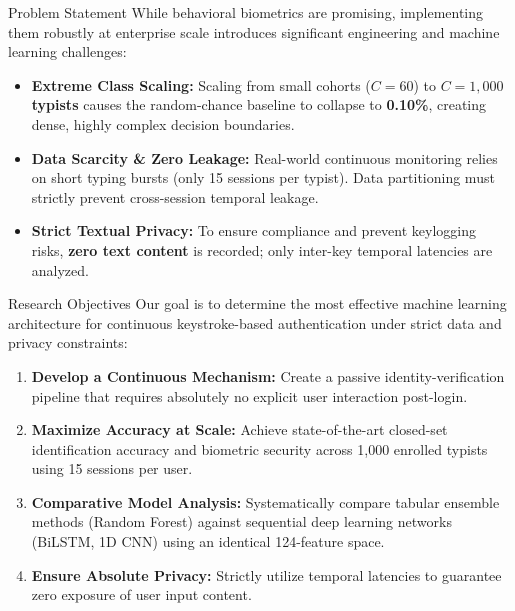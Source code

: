 \documentclass[final]{beamer}
\newlength{\colwidth}
\begin{document}
\begin{frame}[t]
\begin{columns}[t]
\begin{column}{\colwidth}
  \begin{block}{Problem Statement}
    While behavioral biometrics are promising, implementing them robustly at enterprise scale introduces significant engineering and machine learning challenges:
    \begin{itemize}
      \item \textbf{Extreme Class Scaling:} Scaling from small cohorts ($C=60$) to \textbf{$C=1{,}000$ typists} causes the random-chance baseline to collapse to \textbf{0.10\%}, creating dense, highly complex decision boundaries.
      \item \textbf{Data Scarcity \& Zero Leakage:} Real-world continuous monitoring relies on short typing bursts (only 15 sessions per typist). Data partitioning must strictly prevent cross-session temporal leakage.
      \item \textbf{Strict Textual Privacy:} To ensure compliance and prevent keylogging risks, \textbf{zero text content} is recorded; only inter-key temporal latencies are analyzed.
    \end{itemize}
  \end{block}

  \begin{block}{Research Objectives}
    Our goal is to determine the most effective machine learning architecture for continuous keystroke-based authentication under strict data and privacy constraints:
    \begin{enumerate}
      \item \textbf{Develop a Continuous Mechanism:} Create a passive identity-verification pipeline that requires absolutely no explicit user interaction post-login.
      \item \textbf{Maximize Accuracy at Scale:} Achieve state-of-the-art closed-set identification accuracy and biometric security across 1,000 enrolled typists using 15 sessions per user.
      \item \textbf{Comparative Model Analysis:} Systematically compare tabular ensemble methods (Random Forest) against sequential deep learning networks (BiLSTM, 1D CNN) using an identical 124-feature space.
      \item \textbf{Ensure Absolute Privacy:} Strictly utilize temporal latencies to guarantee zero exposure of user input content.
    \end{enumerate}
  \end{block}

\end{column}


\end{columns}
\end{frame}
\end{document}
